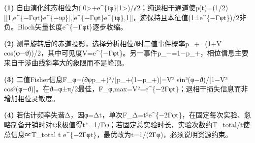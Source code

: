 \par\noindent\textbf{(1)} 自由演化纯态相位为(|0>+e\textasciicircum{}\{iφ\}|1>)/√2；纯退相干通道使ρ(t)=(1/2)[[1,e\textasciicircum{}\{−Γφt\}e\textasciicircum{}\{−iφ\}],[e\textasciicircum{}\{−Γφt\}e\textasciicircum{}\{iφ\},1]]，迹保持且本征值(1±e\textasciicircum{}\{−Γφt\})/2非负。Bloch矢量长度e\textasciicircum{}\{−Γφt\}逐步收缩。
\par\noindent\textbf{(2)} 测量旋转后的赤道投影，选择分析相位ϑ时二值事件概率p\_+=(1+V cos(φ−ϑ))/2，其中可见度V=e\textasciicircum{}\{−Γφt\}。另一事件p\_−=1−p\_+，相位信息主要来自干涉曲线斜率大的象限而不是峰顶。
\par\noindent\textbf{(3)} 二值Fisher信息F\_φ=(∂φp\_+)²/[p\_+(1−p\_+)]=V² sin²(φ−ϑ)/[1−V² cos²(φ−ϑ)]。在ϑ=φ±π/2最佳，F\_φ,max=V²=e\textasciicircum{}\{−2Γφt\}；退相干损失信息而非增加相位灵敏度。
\par\noindent\textbf{(4)} 若估计频率失谐Δ，因φ=Δt，单次F\_Δ=t²e\textasciicircum{}\{−2Γφt\}，在固定每次实验、忽略制备开销时对t求极值得t*=1/Γφ；若固定总实验时长，实验次数约T\_total/t使总信息∝T\_total t e\textasciicircum{}\{−2Γφt\}，最优改为t=1/(2Γφ)，必须说明资源约束。
